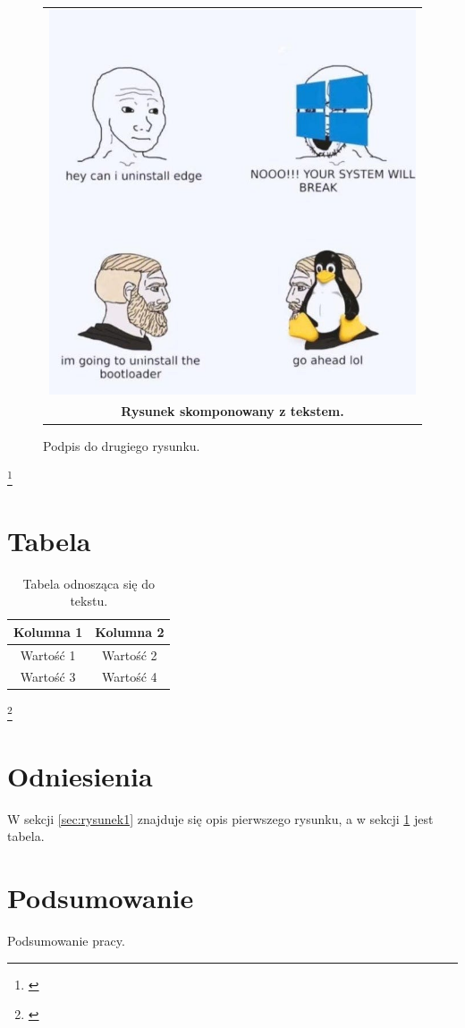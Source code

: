 \documentclass[polski]{article}
\begin{document}
\begin{figure}[h]
    \centering
    \begin{tabular}{c}
        \includegraphics[width=0.4\linewidth]{rysunek2.jpg} \\
        \textbf{Rysunek skomponowany z tekstem.}
    \end{tabular}
    \caption{Podpis do drugiego rysunku.}
    \label{sec:rysunek2}
    
\end{figure}
\footnote{\cite{raport}}
\section{Tabela}
\begin{table}[h]
    \centering
    \begin{tabular}{|c|c|}
        \hline
        Kolumna 1 & Kolumna 2 \\
        \hline
        Wartość 1 & Wartość 2 \\
        Wartość 3 & Wartość 4 \\
        \hline
    \end{tabular}
    \caption{Tabela odnosząca się do tekstu.}
    \label{sec:tabela}
\end{table}
\footnote{\cite{online}}
\section{Odniesienia}
W sekcji \ref{sec:rysunek1} znajduje się opis pierwszego rysunku, a w sekcji \ref{sec:tabela} jest tabela.

\section{Podsumowanie}
Podsumowanie pracy.



\end{document}
